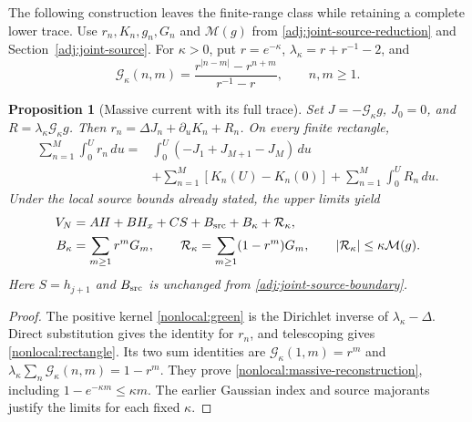 \documentclass[11pt]{article}
\numberwithin{equation}{section}
\newtheorem{proposition}[theorem]{Proposition}
\theoremstyle{definition}
\theoremstyle{remark}
\begin{document}
The following construction leaves the finite-range class while
retaining a complete lower trace. Use $r_n,K_n,g_n,G_n$ and
$\mathcal M(g)$ from \eqref{adj:joint-source-reduction} and
Section~\ref{adj:joint-source}. For $\kappa>0$, put
$r=e^{-\kappa}$, $\lambda_\kappa=r+r^{-1}-2$, and
\begin{equation}
 \mathcal G_\kappa(n,m)
 =\frac{r^{|n-m|}-r^{n+m}}{r^{-1}-r},\qquad n,m\ge1.
 \label{nonlocal:green}
\end{equation}
\begin{proposition}[Massive current with its full trace]
\label{nonlocal:massive-current}
Set $J=-\mathcal G_\kappa g$, $J_0=0$, and
$R=\lambda_\kappa\mathcal G_\kappa g$. Then
$r_n=\Delta J_n+\partial_uK_n+R_n$. On every finite rectangle,
\begin{equation}
 \begin{aligned}
 \sum_{n=1}^M\int_0^U r_n\,du
 ={}&\int_0^U(-J_1+J_{M+1}-J_M)\,du\\
 &+\sum_{n=1}^M[K_n(U)-K_n(0)]
  +\sum_{n=1}^M\int_0^UR_n\,du.
 \end{aligned}
 \label{nonlocal:rectangle}
\end{equation}
Under the local source bounds already stated, the upper limits yield
\begin{align}
 V_N&=AH+BH_x+CS+B_{\rm src}+B_\kappa+\mathcal R_\kappa,
   \notag\\
 B_\kappa&=\sum_{m\ge1}r^mG_m,
 \qquad \mathcal R_\kappa=\sum_{m\ge1}(1-r^m)G_m,
 \qquad |\mathcal R_\kappa|\le\kappa\mathcal M(g).
 \label{nonlocal:massive-reconstruction}
\end{align}
Here $S=h_{j+1}$ and $B_{\rm src}$ is unchanged from
\eqref{adj:joint-source-boundary}.
\end{proposition}
\begin{proof}
The positive kernel \eqref{nonlocal:green} is the Dirichlet inverse of
$\lambda_\kappa-\Delta$. Direct substitution gives the identity for
$r_n$, and telescoping gives \eqref{nonlocal:rectangle}.
Its two sum identities are
$\mathcal G_\kappa(1,m)=r^m$ and
$\lambda_\kappa\sum_n\mathcal G_\kappa(n,m)=1-r^m$.
They prove \eqref{nonlocal:massive-reconstruction}, including
$1-e^{-\kappa m}\le\kappa m$. The earlier Gaussian index and source
majorants justify the limits for each fixed $\kappa$.
\end{proof}
\end{document}
